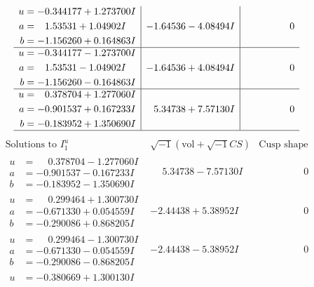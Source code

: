 \documentclass[1p]{elsarticle_modified}
\theoremstyle{definition}
\newcommand{\I}{\sqrt{-1}}
\begin{document}
$$\begin{array}{c|c|c}
\begin{aligned}
u &= -0.344177 + 1.273700 I \\
a &= \phantom{-}1.53531 + 1.04902 I \\
b &= -1.156260 + 0.164863 I\end{aligned}
 & -1.64536 - 4.08494 I & \phantom{-0.000000 } 0 \\ \hline\begin{aligned}
u &= -0.344177 - 1.273700 I \\
a &= \phantom{-}1.53531 - 1.04902 I \\
b &= -1.156260 - 0.164863 I\end{aligned}
 & -1.64536 + 4.08494 I & \phantom{-0.000000 } 0 \\ \hline\begin{aligned}
u &= \phantom{-}0.378704 + 1.277060 I \\
a &= -0.901537 + 0.167233 I \\
b &= -0.183952 + 1.350690 I\end{aligned}
 & \phantom{-}5.34738 + 7.57130 I & \phantom{-0.000000 } 0\\
 \hline 
 \end{array}$$\newpage$$\begin{array}{c|c|c}  
\text{Solutions to }I^u_{1}& \I (\text{vol} + \sqrt{-1}CS) & \text{Cusp shape}\\
 \hline 
\begin{aligned}
u &= \phantom{-}0.378704 - 1.277060 I \\
a &= -0.901537 - 0.167233 I \\
b &= -0.183952 - 1.350690 I\end{aligned}
 & \phantom{-}5.34738 - 7.57130 I & \phantom{-0.000000 } 0 \\ \hline\begin{aligned}
u &= \phantom{-}0.299464 + 1.300730 I \\
a &= -0.671330 + 0.054559 I \\
b &= -0.290086 + 0.868205 I\end{aligned}
 & -2.44438 + 5.38952 I & \phantom{-0.000000 } 0 \\ \hline\begin{aligned}
u &= \phantom{-}0.299464 - 1.300730 I \\
a &= -0.671330 - 0.054559 I \\
b &= -0.290086 - 0.868205 I\end{aligned}
 & -2.44438 - 5.38952 I & \phantom{-0.000000 } 0 \\ \hline\begin{aligned}
u &= -0.380669 + 1.300130 I \\

\end{aligned}
\end{array}$$
\end{document}
